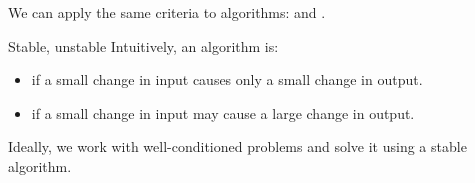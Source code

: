 We can apply the same criteria to algorithms:  and .

\begin{dfnbox}{Stable, unstable}{}
    Intuitively, an algorithm is:
    \begin{itemize}
        \item {} if a small change in input causes only a small change in output.
        \item {} if a small change in input may cause a large change in output.
    \end{itemize}
\end{dfnbox}

Ideally, we work with well-conditioned problems and solve it using a stable algorithm.
